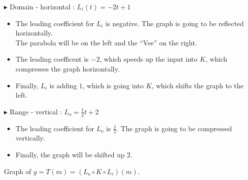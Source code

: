 \documentclass{ximera}
\begin{document}
$\blacktriangleright$ Domain - horizontal : $L_i(t) = -2t + 1$


\begin{itemize}
\item The leading coefficient for $L_i$ is negative.  The graph is going to be reflected horizontally. \\
The parabola will be on the left and the ``Vee'' on the right.
\item The leading coefficent is $-2$, which speeds up the input into $K$, which compresses the graph horizontally.
\item Finally, $L_i$ is adding $1$, which is going into $K$, which shifts the graph to the left.

\end{itemize}





$\blacktriangleright$ Range - vertical : $L_o = \frac{1}{2}t + 2$


\begin{itemize}
\item The leading coefficient for $L_o$ is $\frac{1}{2}$.  The graph is going to be compressed vertically. \\
\item Finally, the graph will be shifted up $2$.

\end{itemize}


Graph of $ y = T(m) = (L_o \circ K \circ L_i)(m)$.
\end{document}
